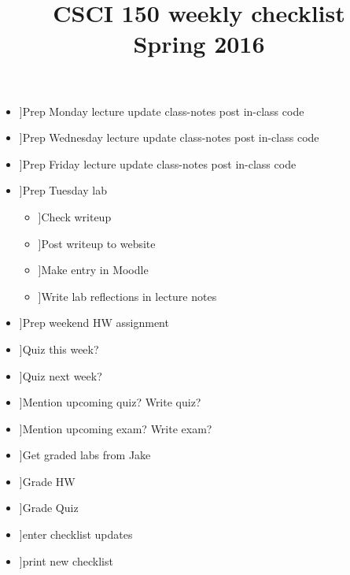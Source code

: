 \documentclass{article}
\title{CSCI 150 weekly checklist \\ {\small Spring 2016}}
\date{}
\newcommand{\cbox}{\framebox[1em]{\phantom{x}}}
\newcommand{\ci}{\item[\cbox]}
\newcommand{\also}{\cbox \hspace{1ex}}
\begin{document}
\maketitle
\thispagestyle{empty}

\begin{itemize}
\ci Prep Monday lecture \also update class-notes \also post in-class code
\ci Prep Wednesday lecture \also update class-notes \also post in-class code
\ci Prep Friday lecture \also update class-notes \also post in-class code \\

\ci Prep Tuesday lab
\begin{itemize}
\ci Check writeup
\ci Post writeup to website
\ci Make entry in Moodle
\ci Write lab reflections in lecture notes
\end{itemize}
\ci Prep weekend HW assignment \\

\ci Quiz this week?
\ci Quiz next week?
\ci Mention upcoming quiz? \also Write quiz?
\ci Mention upcoming exam? \also Write exam? \\

\ci Get graded labs from Jake
\ci Grade HW
\ci Grade Quiz \\

\ci enter checklist updates
\ci print new checklist
\end{itemize}
\end{document}
